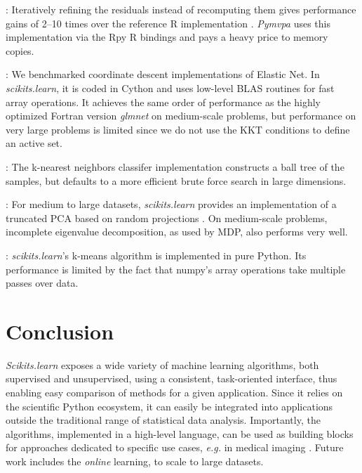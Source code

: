 \documentclass[twoside,11pt]{article}
\begin{document}
\smallskip {}:
%
Iteratively refining the residuals instead of recomputing them gives
performance gains of 2--10 times over the reference R implementation
\citep{LARS}. {\sl Pymvpa} uses this implementation via the Rpy R
bindings and pays a heavy price to memory copies.


\smallskip {}:
%
We benchmarked coordinate descent implementations of Elastic Net.  In
\emph{scikits.learn}, it is coded in Cython and uses low-level BLAS
routines for fast array operations. It achieves the same order of
performance as the highly optimized Fortran version \emph{glmnet}
\citep{friedman2010} on medium-scale problems, but performance on very
large problems is limited since we do not use the KKT conditions to
define an active set.

\smallskip
{}:
%
The k-nearest neighbors classifer implementation constructs a ball
tree \citep{omohundro1989} of the samples, but defaults to a more
efficient brute force search in large dimensions.

\smallskip {}:
%
For medium to large datasets, \emph{scikits.learn} provides an
implementation of a truncated PCA based on random projections
\citep{rokhlin2009}. On medium-scale problems, incomplete eigenvalue
decomposition, as used by MDP, also performs very well.

\smallskip
{}:
%
\emph{scikits.learn}'s k-means algorithm is implemented in pure
Python.  Its performance is limited by the fact that numpy's
array operations take multiple passes over data.

\section{Conclusion}

\emph{Scikits.learn} exposes a wide variety of machine learning
algorithms, both supervised and unsupervised, using a consistent,
task-oriented interface, thus enabling easy comparison of methods for a
given application.
%
Since it relies on the scientific Python ecosystem, it can easily be
integrated into applications outside the traditional range of statistical
data analysis. Importantly, the algorithms, implemented in a high-level
language, can be used as building blocks for approaches dedicated to
specific use cases, \emph{e.g.} in medical imaging \citep{Michel2011}.
%
Future work includes the \emph{online} learning, to scale to
large datasets.


\end{document}
